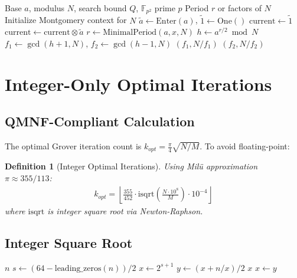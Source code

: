 \documentclass[11pt,a4paper]{article}
\newtheorem{definition}{Definition}
\begin{document}
\begin{algorithm}
\caption{Period-Grover Fusion}
\begin{algorithmic}[1]
\Require Base $a$, modulus $N$, search bound $Q$, $\mathbb{F}_{p^2}$ prime $p$
\Ensure Period $r$ or factors of $N$
\State Initialize Montgomery context for $N$
\State $\tilde{a} \gets \text{Enter}(a)$, $\tilde{1} \gets \text{One}()$
\State $\text{current} \gets \tilde{1}$
    \State $\text{current} \gets \text{current} \otimes \tilde{a}$ 
        \State $r \gets \text{MinimalPeriod}(a, x, N)$
            \State $h \gets a^{r/2} \bmod N$
                \State $f_1 \gets \gcd(h+1, N)$, $f_2 \gets \gcd(h-1, N)$
                 \Return $(f_1, N/f_1)$
                 \Return $(f_2, N/f_2)$
                \EndIf
            \EndIf
        \EndIf
    \EndIf
\EndFor
\end{algorithmic}
\end{algorithm}

\section{Integer-Only Optimal Iterations}

\subsection{QMNF-Compliant Calculation}

The optimal Grover iteration count is $k_{opt} = \frac{\pi}{4}\sqrt{N/M}$. To avoid floating-point:

\begin{definition}[Integer Optimal Iterations]
Using Mil\"u approximation $\pi \approx 355/113$:
\begin{align}
k_{opt} = \left\lfloor \frac{355}{452} \cdot \text{isqrt}\left(\frac{N \cdot 10^8}{M}\right) \cdot 10^{-4} \right\rfloor
\end{align}
where $\text{isqrt}$ is integer square root via Newton-Raphson.
\end{definition}

\subsection{Integer Square Root}

\begin{algorithm}
\caption{QMNF Integer Square Root}
\begin{algorithmic}[1]
     \Return $n$
    \EndIf
    \State $s \gets (64 - \text{leading\_zeros}(n)) / 2$
    \State $x \gets 2^{s+1}$ 
    \Loop
        \State $y \gets (x + n/x) / 2$
         \Return $x$
        \EndIf
        \State $x \gets y$
    \EndLoop
\EndProcedure
\end{algorithmic}
\end{algorithm}
\end{document}
